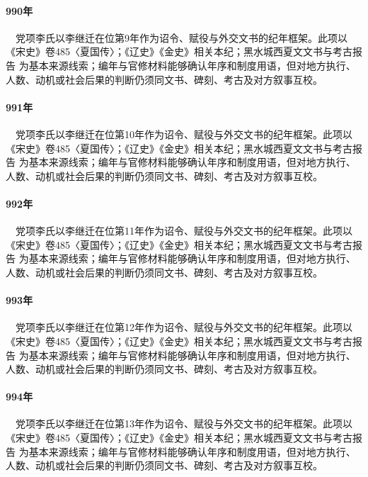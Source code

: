 \paragraph{990年}　党项李氏以李继迁在位第9年作为诏令、赋役与外交文书的纪年框架。此项以《宋史》卷485〈夏国传〉；《辽史》《金史》相关本纪；黑水城西夏文文书与考古报告 为基本来源线索；编年与官修材料能够确认年序和制度用语，但对地方执行、人数、动机或社会后果的判断仍须同文书、碑刻、考古及对方叙事互校。

\paragraph{991年}　党项李氏以李继迁在位第10年作为诏令、赋役与外交文书的纪年框架。此项以《宋史》卷485〈夏国传〉；《辽史》《金史》相关本纪；黑水城西夏文文书与考古报告 为基本来源线索；编年与官修材料能够确认年序和制度用语，但对地方执行、人数、动机或社会后果的判断仍须同文书、碑刻、考古及对方叙事互校。

\paragraph{992年}　党项李氏以李继迁在位第11年作为诏令、赋役与外交文书的纪年框架。此项以《宋史》卷485〈夏国传〉；《辽史》《金史》相关本纪；黑水城西夏文文书与考古报告 为基本来源线索；编年与官修材料能够确认年序和制度用语，但对地方执行、人数、动机或社会后果的判断仍须同文书、碑刻、考古及对方叙事互校。

\paragraph{993年}　党项李氏以李继迁在位第12年作为诏令、赋役与外交文书的纪年框架。此项以《宋史》卷485〈夏国传〉；《辽史》《金史》相关本纪；黑水城西夏文文书与考古报告 为基本来源线索；编年与官修材料能够确认年序和制度用语，但对地方执行、人数、动机或社会后果的判断仍须同文书、碑刻、考古及对方叙事互校。

\paragraph{994年}　党项李氏以李继迁在位第13年作为诏令、赋役与外交文书的纪年框架。此项以《宋史》卷485〈夏国传〉；《辽史》《金史》相关本纪；黑水城西夏文文书与考古报告 为基本来源线索；编年与官修材料能够确认年序和制度用语，但对地方执行、人数、动机或社会后果的判断仍须同文书、碑刻、考古及对方叙事互校。

